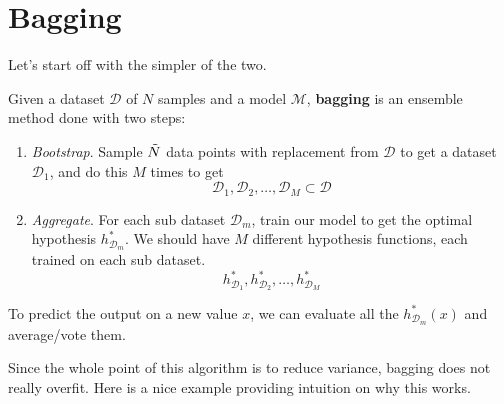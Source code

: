 \section{Bagging}

  Let's start off with the simpler of the two. 

  \begin{definition}
    \label{def:bootstrap-aggregating}
    Given a dataset $\mathcal{D}$ of $N$ samples and a model $\mathcal{M}$, \textbf{bagging} is an ensemble method done with two steps: 
    \begin{enumerate}
      \item \textit{Bootstrap}. Sample $\Tilde{N}$ data points with replacement from $\mathcal{D}$ to get a dataset $\mathcal{D}_1$, and do this $M$ times to get 
      \begin{equation}
        \mathcal{D}_1, \mathcal{D}_2, \ldots, \mathcal{D}_M \subset \mathcal{D}
      \end{equation}
      \item \textit{Aggregate}. For each sub dataset $\mathcal{D}_m$, train our model to get the optimal hypothesis $h_{\mathcal{D}_m}^\ast$. We should have $M$ different hypothesis functions, each trained on each sub dataset. 
      \begin{equation}
        h_{\mathcal{D}_1}^\ast, h_{\mathcal{D}_2}^\ast, \ldots, h_{\mathcal{D}_M}^\ast
      \end{equation}
    \end{enumerate}
    To predict the output on a new value $x$, we can evaluate all the $h_{\mathcal{D}_m}^\ast (x)$ and average/vote them.
  \end{definition}

  Since the whole point of this algorithm is to reduce variance, bagging does not really overfit. Here is a nice example providing intuition on why this works. 

